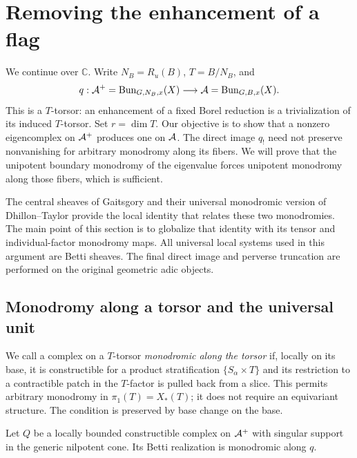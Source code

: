 \section{Removing the enhancement of a flag}\label{sec:descent}

We continue over $\mathbb C$.  Write $N_B=R_u(B)$, $T=B/N_B$, and
\[
 q:\mathcal A^+=\operatorname{Bun}_{G,N_B,x}(X)\longrightarrow
 \mathcal A=\operatorname{Bun}_{G,B,x}(X).
\]
This is a $T$-torsor: an enhancement of a fixed Borel reduction is a
trivialization of its induced $T$-torsor.  Set $r=\dim T$.  Our objective
is to show that a nonzero eigencomplex on $\mathcal A^+$ produces one on $\mathcal A$.
The direct image $q_!$ need not preserve nonvanishing for arbitrary
monodromy along its fibers.  We will prove that the unipotent boundary
monodromy of the eigenvalue forces unipotent monodromy along those
fibers, which is sufficient.

The central sheaves of Gaitsgory and their universal monodromic version
of Dhillon--Taylor provide the local identity that relates these two
monodromies.  The main point of this section is to globalize that
identity with its tensor and individual-factor monodromy maps.  All
universal local systems used in this argument are Betti sheaves.  The
final direct image and perverse truncation are performed on the original
geometric adic objects.

\subsection{Monodromy along a torsor and the universal unit}

We call a complex on a $T$-torsor \emph{monodromic along the torsor} if,
locally on its base, it is constructible for a product stratification
$\{S_\alpha\times T\}$ and its restriction to a contractible patch in
the $T$-factor is pulled back from a slice.  This permits arbitrary
monodromy in $\pi_1(T)=X_*(T)$; it does not require an equivariant
structure.  The condition is preserved by base change on the base.

\begin{lemma}\label{lem:descent-monodromic}
Let $Q$ be a locally bounded constructible complex on $\mathcal A^+$ with
singular support in the generic nilpotent cone.  Its Betti realization
is monodromic along $q$.
\end{lemma}

